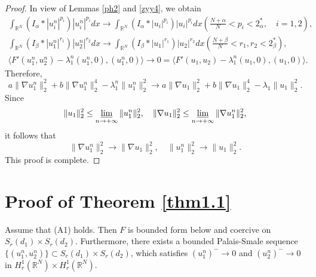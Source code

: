 \documentclass[reqno]{amsart}
\begin{document}
\begin{proof}
In view of Lemmas \ref{ph2} and  \ref{zyy4}, we obtain
\begin{gather}\label{vbp1}
\int_{\mathbb{R}^N}(I_\alpha\ast|u_i^n|^{p_i})|u_i^n|^{p_i}dx
\to \int_{\mathbb{R}^N}(I_\alpha\ast|u_i|^{p_i})|u_i|^{p_i}dx 
(\frac{N+\alpha}{N}<p_i<2_\alpha^*,\quad  i=1,2), \\
\label{vbp2}
\int_{\mathbb{R}^N}(I_\beta\ast|u_1^n|^{r_1})|u_2^n|^{r_2}dx
\to \int_{\mathbb{R}^N}(I_\beta\ast|u_1|^{r_1})|u_2|^{r_2}dx (\frac{N+\beta}{N}
<r_1,r_2<2_\beta^*), \\
\langle F'(u_1^n,u_2^n)-\lambda_1^n(u_1^n,0),(u_1^n,0)\rangle\to 0
= \langle F'(u_1,u_2)-\lambda_1^n(u_1,0),(u_1,0)\rangle.
\end{gather}
Therefore,
\[
a\| \nabla u_1^n\|_2^2+b\| \nabla u_1^n\|_2^4-\lambda_1^n\| u_1^n\|_2^2\to
a\| \nabla u_1\|_2^2+b\| \nabla u_1\|_2^4-\lambda_1\| u_1\|_2^2.
\]
Since
\begin{equation}\label{vbp3}
 \| u_1\|_2^2\leq \varliminf_{n\to +\infty} \| u_1^n\|_2^2, \quad
 \| \nabla u_1\|_2^2\leq \varliminf_{n\to +\infty} \| \nabla u_1^n\|_2^2,
\end{equation}
it follows that
\[
 \| \nabla u_1^n\|_2^2\to \| \nabla u_1\|_2^2, \quad
 \| u_1^n\|_2^2\to \| u_1\|_2^2.
\]
This proof is complete.
\end{proof}

\section{Proof of Theorem \ref{thm1.1}} 

\begin{lemma}\label{xj5}
Assume that {\rm (A1)} holds. Then $F$ is bounded form below and coercive on 
$S_{r}(d_1)\times S_{r}(d_2)$. Furthermore, there exists a bounded
Palais-Smale sequence $\{(u_1^n,u_2^n)\}\subset S_{r}(d_1)\times S_{r}(d_2)$, 
which satisfies $(u_1^n)^-\to 0$ and
$(u_2^n)^-\to 0$ in $H_r^1(\mathbb{R}^N)\times H_r^1(\mathbb{R}^N)$.
\end{lemma}
\end{document}
